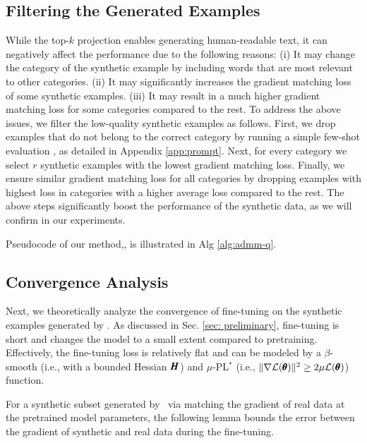 \subsection{Filtering the Generated Examples}\label{sec:filtering}
While the top-$k$ projection enables generating human-readable text, it can negatively affect the performance due to the following reasons: ({i}) It may change the category of the synthetic example by including words that are most relevant to other categories. ({ii}) It may significantly increases the gradient matching loss of some synthetic examples. ({iii}) It may result in a much higher gradient matching loss for some categories compared to the rest. 
%
To address the above issues, we filter the low-quality synthetic examples as follows.
First, we drop examples that do not belong to the correct category by running a simple few-shot evaluation \cite{li2023synthetic}, as detailed in Appendix \ref{app:prompt}. 
%
%
Next, for every category we select $r$ synthetic examples with the lowest gradient matching loss. 
%
Finally, we ensure similar gradient matching loss for all categories by dropping examples with highest loss in categories with a higher average loss compared to the rest. 
%
%
The above steps significantly boost the performance of the synthetic data, as we will confirm in our experiments.

Pseudocode of our method,\alg, is illustrated in Alg\! \ref{alg:admm-q}.

%

\subsection{Convergence Analysis}
Next, we theoretically analyze the convergence of fine-tuning on the synthetic examples generated by \alg.
%
As discussed in Sec. \ref{sec: preliminary}, fine-tuning is short and changes the model to a small extent compared to pretraining. Effectively, the fine-tuning loss is relatively flat and can be modeled by a $\beta$-smooth (i.e., with a bounded Hessian $\pmb{H}$) and $\mu$-PL$^*$ \big(i.e., $\|\nabla {\mathcal{L}}(\pmb{\theta})\|^2 \geq 2\mu{\mathcal{L}}(\pmb{\theta})$\big) function. 
%

For a synthetic subset generated by \alg~via matching the gradient of real data at the pretrained model parameters, the following lemma bounds the error between the gradient of synthetic and real data during the fine-tuning. 
%
%
%
%
%
%
%
%
%
%
%

